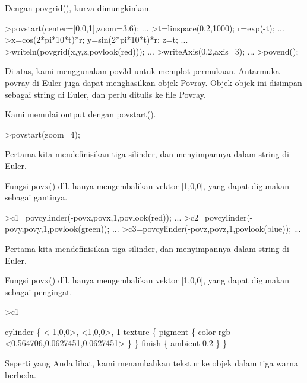 \documentclass[a4paper,10pt]{article}
\begin{document}
\begin{eulernotebook}
\begin{eulercomment}
\begin{eulercomment}
\begin{eulercomment}
\begin{eulercomment}
\begin{eulercomment}
\begin{eulercomment}
\begin{eulercomment}
\begin{eulercomment}
\begin{eulercomment}
\begin{eulercomment}
\begin{eulercomment}
Dengan povgrid(), kurva dimungkinkan.
\end{eulercomment}
\begin{eulerprompt}
>povstart(center=[0,0,1],zoom=3.6); ...
>t=linspace(0,2,1000); r=exp(-t); ...
>x=cos(2*pi*10*t)*r; y=sin(2*pi*10*t)*r; z=t; ...
>writeln(povgrid(x,y,z,povlook(red))); ...
>writeAxis(0,2,axis=3); ...
>povend();
\end{eulerprompt}
\begin{eulercomment}
Di atas, kami menggunakan pov3d untuk memplot permukaan. Antarmuka
povray di Euler juga dapat menghasilkan objek Povray. Objek-objek ini
disimpan sebagai string di Euler, dan perlu ditulis ke file Povray.

Kami memulai output dengan povstart().
\end{eulercomment}
\begin{eulerprompt}
>povstart(zoom=4);
\end{eulerprompt}
\begin{eulercomment}
Pertama kita mendefinisikan tiga silinder, dan menyimpannya dalam
string di Euler.

Fungsi povx() dll. hanya mengembalikan vektor [1,0,0], yang dapat
digunakan sebagai gantinya.
\end{eulercomment}
\begin{eulerprompt}
>c1=povcylinder(-povx,povx,1,povlook(red)); ...
>c2=povcylinder(-povy,povy,1,povlook(green)); ...
>c3=povcylinder(-povz,povz,1,povlook(blue)); ...
\end{eulerprompt}
\begin{eulercomment}
Pertama kita mendefinisikan tiga silinder, dan menyimpannya dalam
string di Euler.

Fungsi povx() dll. hanya mengembalikan vektor [1,0,0], yang dapat
digunakan sebagai pengingat.
\end{eulercomment}
\begin{eulerprompt}
>c1
\end{eulerprompt}
\begin{euleroutput}
  cylinder \{ <-1,0,0>, <1,0,0>, 1
   texture \{ pigment \{ color rgb <0.564706,0.0627451,0.0627451> \}  \} 
   finish \{ ambient 0.2 \} 
   \}
\end{euleroutput}
\begin{eulercomment}
Seperti yang Anda lihat, kami menambahkan tekstur ke objek dalam tiga
warna berbeda.


\end{eulercomment}
\end{eulercomment}
\end{eulercomment}
\end{eulercomment}
\end{eulercomment}
\end{eulercomment}
\end{eulercomment}
\end{eulercomment}
\end{eulercomment}
\end{eulercomment}
\end{eulercomment}
\end{eulernotebook}
\end{document}
